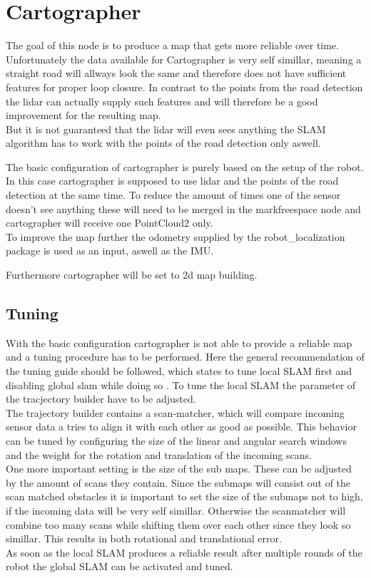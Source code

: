 \section{Cartographer}
The goal of this node is to produce a map that gets more reliable over time.\\

Unfortunately the data available for Cartographer is very self simillar, meaning a straight road will allways look the same and therefore does not have sufficient features for proper loop closure. In contrast to the points from the road detection the lidar can actually supply such features and will therefore be a good improvement for the resulting map.\\

But it is not guaranteed that the lidar will even sees anything the SLAM algorithm has to work with the points of the road detection only aswell.

The basic configuration of cartographer is purely based on the setup of the robot. In this case cartographer is supposed to use lidar and the points of the road detection at the same time. To reduce the amount of times one of the sensor doesn't see anything these will need to be merged in the markfreespace node and cartographer will receive one PointCloud2 only.\\
To improve the map further the odometry supplied by the robot\_localization package is used as an input, aswell as the IMU.

Furthermore cartographer will be set to 2d map building.


\subsection{Tuning}
With the basic configuration cartographer is not able to provide a reliable map and a tuning procedure has to be performed. Here the general recommendation of the tuning guide should be followed, which states to tune local SLAM first and disabling global slam while doing so \cite{cartographertuning}.
To tune the local SLAM the parameter of the tracjectory builder have to be adjusted.\\
The trajectory builder contains a scan-matcher, which will compare incoming sensor data a tries to align it with each other as good as possible. This behavior can be tuned by configuring the size of the linear and angular search windows and the weight for the rotation and translation of the incoming scans.\\
One more important setting is the size of the sub maps. These can be adjusted by the amount of scans they contain. Since the submaps will consist out of the scan matched obstacles it is important to set the size of the submaps not to high, if the incoming data will be very self simillar. Otherwise the scanmatcher will combine too many scans while shifting them over each other since they look so simillar. This results in both rotational and translational error.\\
As soon as the local SLAM produces a reliable result after multiple rounds of the robot the global SLAM can be activated and tuned.\\

